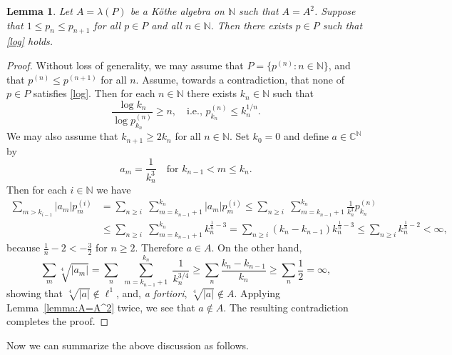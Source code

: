 \documentclass[12pt,reqno]{amsart}
\newtheorem{lemma}[theorem]{Lemma}
\theoremstyle{definition}
\begin{document}
\begin{lemma}
\label{lemma:idemp_log}
Let $A=\lambda(P)$ be a K\"othe algebra on ${\mathbb N}$ such that $A=A^2$.
Suppose that $1\le p_n\le p_{n+1}$ for all $p\in P$ and all $n\in{\mathbb N}$.
Then there exists $p\in P$ such that \eqref{log} holds.
\end{lemma}
\begin{proof}
Without loss of generality, we may assume that
$P=\{ p^{(n)} : n\in{\mathbb N}\}$, and that $p^{(n)}\le p^{(n+1)}$ for all $n$.
Assume, towards a contradiction, that none of $p\in P$ satisfies \eqref{log}.
Then for each $n\in{\mathbb N}$ there exists $k_n\in{\mathbb N}$ such that
\[
\frac{\log k_n}{\log p_{k_n}^{(n)}}\ge n, \quad\text{i.e., }
p_{k_n}^{(n)}\le k_n^{1/n}.
\]
We may also assume that $k_{n+1}\ge 2k_n$ for all $n\in{\mathbb N}$. Set $k_0=0$
and define $a\in{\mathbb C}^{\mathbb N}$ by
\[
a_m=\frac{1}{k_n^3}\quad\text{for } k_{n-1}<m\le k_n.
\]
Then for each $i\in{\mathbb N}$ we have
\[
\begin{split}
\sum_{m>k_{i-1}} |a_m| p_m^{(i)}
&=\sum_{n\ge i} \;\sum_{m=k_{n-1}+1}^{k_n} |a_m|p_m^{(i)}
\le \sum_{n\ge i}\; \sum_{m=k_{n-1}+1}^{k_n} \frac{1}{k_n^3} p_{k_n}^{(n)}\\
&\le \sum_{n\ge i}\; \sum_{m=k_{n-1}+1}^{k_n} k_n^{\frac{1}{n}-3}
= \sum_{n\ge i} (k_n-k_{n-1}) k_n^{\frac{1}{n}-3}
\le \sum_{n\ge i} k_n^{\frac{1}{n}-2}<\infty,
\end{split}
\]
because $\frac{1}{n}-2<-\frac{3}{2}$ for $n\ge 2$. Therefore $a\in A$.
On the other hand,
\[
\sum_m \sqrt[4]{|a_m|}
=\sum_n \;\sum_{m=k_{n-1}+1}^{k_n}\; \frac{1}{k_n^{3/4}}
\ge\sum_n \frac{k_n-k_{n-1}}{k_n}
\ge\sum_n \frac{1}{2}=\infty,
\]
showing that $\sqrt[4]{|a|}\notin\ell^1$, and, {\em a fortiori},
$\sqrt[4]{|a|}\notin A$. Applying Lemma~\ref{lemma:A=A^2} twice,
we see that $a\notin A$. The resulting contradiction completes the proof.
\end{proof}

Now we can summarize the above discussion as follows.
\end{document}
